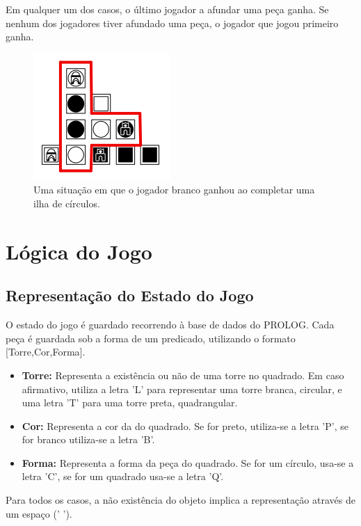 \documentclass[a4paper]{article}
\begin{document}
Em qualquer um dos casos, o último jogador a afundar uma peça ganha. Se nenhum dos jogadores tiver afundado uma peça, o jogador que jogou primeiro ganha.

\begin{figure}[h]
\centering
\includegraphics[scale=0.9]{win.png}
\caption{Uma situação em que o jogador branco ganhou ao completar uma ilha de círculos.}
\label{fig:win}
\end{figure}


\section{Lógica do Jogo}

\subsection{Representação do Estado do Jogo}
\label{gamestate}

O estado do jogo é guardado recorrendo à base de dados do PROLOG. Cada peça é guardada sob a forma de um predicado, utilizando o formato [Torre,Cor,Forma].

\begin{itemize}
\item \textbf{Torre:} Representa a existência ou não de uma torre no quadrado. Em caso afirmativo, utiliza a letra 'L' para representar uma torre branca, circular, e uma letra 'T' para uma torre preta, quadrangular.
\item \textbf{Cor:} Representa a cor da do quadrado. Se for preto, utiliza-se a letra 'P', se for branco utiliza-se a letra 'B'.
\item \textbf{Forma:} Representa a forma da peça do quadrado. Se for um círculo, usa-se a letra 'C', se for um quadrado usa-se a letra 'Q'.
\end{itemize}

Para todos os casos, a não existência do objeto implica a representação através de um espaço (' ').
\end{document}
